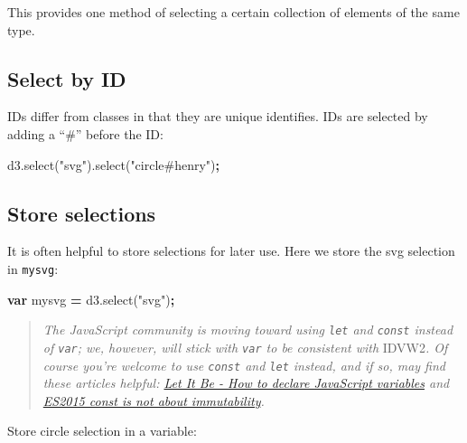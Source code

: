 \documentclass[openany]{book}
\newenvironment{Shaded}{\begin{snugshade}}{\end{snugshade}}
\newcommand{\AttributeTok}[1]{\textcolor[rgb]{0.77,0.63,0.00}{#1}}
\newcommand{\KeywordTok}[1]{\textcolor[rgb]{0.13,0.29,0.53}{\textbf{#1}}}
\newcommand{\NormalTok}[1]{#1}
\newcommand{\OperatorTok}[1]{\textcolor[rgb]{0.81,0.36,0.00}{\textbf{#1}}}
\newcommand{\StringTok}[1]{\textcolor[rgb]{0.31,0.60,0.02}{#1}}
\newcommand{\VariableTok}[1]{\textcolor[rgb]{0.00,0.00,0.00}{#1}}
\begin{document}
This provides one method of selecting a certain collection of elements of the same type.

\hypertarget{select-by-id}{%
\subsection{Select by ID}\label{select-by-id}}

IDs differ from classes in that they are unique identifies. IDs are selected by adding a ``\#'' before the ID:

\begin{Shaded}
\begin{Highlighting}[]
\VariableTok{d3}\NormalTok{.}\AttributeTok{select}\NormalTok{(}\StringTok{"svg"}\NormalTok{).}\AttributeTok{select}\NormalTok{(}\StringTok{"circle#henry"}\NormalTok{)}\OperatorTok{;}
\end{Highlighting}
\end{Shaded}

\hypertarget{store-selections}{%
\subsection{Store selections}\label{store-selections}}

It is often helpful to store selections for later use. Here we store the svg selection in \texttt{mysvg}:

\begin{Shaded}
\begin{Highlighting}[]
\KeywordTok{var}\NormalTok{ mysvg }\OperatorTok{=} \VariableTok{d3}\NormalTok{.}\AttributeTok{select}\NormalTok{(}\StringTok{"svg"}\NormalTok{)}\OperatorTok{;}
\end{Highlighting}
\end{Shaded}

\begin{quote}
 \emph{The JavaScript community is moving toward using \texttt{let} and \texttt{const} instead of \texttt{var}; we, however, will stick with \texttt{var} to be consistent with }IDVW2\emph{. Of course you're welcome to use \texttt{const} and \texttt{let} instead, and if so, may find these articles helpful: \href{https://madhatted.com/2016/1/25/let-it-be}{Let It Be - How to declare JavaScript variables} and \href{https://mathiasbynens.be/notes/es6-const}{ES2015 const is not about immutability}.}
\end{quote}

Store circle selection in a variable:
\end{document}
